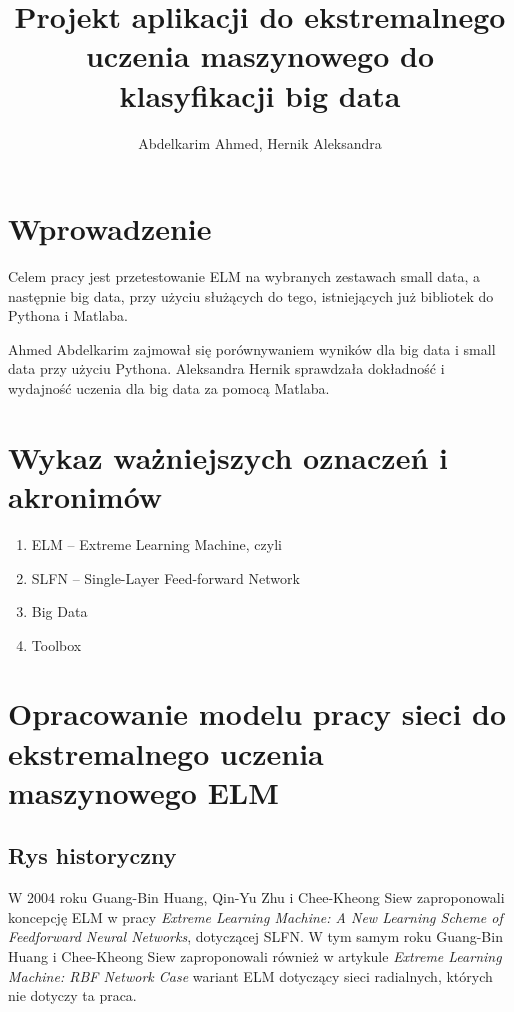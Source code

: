 \documentclass{article}
\title{Projekt aplikacji do ekstremalnego uczenia maszynowego do klasyfikacji big data}
\author{Abdelkarim Ahmed, Hernik Aleksandra}
\date{}
\begin{document}
\clearpage
\vspace*{\fill}
\begin{center}
\begin{minipage}{.9\textwidth}
\maketitle
\end{minipage}
\end{center}
\vfill %
\clearpage

\tableofcontents
\clearpage

\section*{Wprowadzenie}
Celem pracy jest przetestowanie ELM na wybranych zestawach small data, a następnie big data, przy użyciu służących do tego, istniejących już bibliotek do Pythona i Matlaba.

Ahmed Abdelkarim zajmował się porównywaniem wyników dla big data i small data przy użyciu Pythona.
Aleksandra Hernik sprawdzała dokładność i wydajność uczenia dla big data za pomocą Matlaba.

\section*{Wykaz ważniejszych oznaczeń i akronimów}
\begin{enumerate}
\item ELM -- Extreme Learning Machine, czyli 
\item SLFN -- Single-Layer Feed-forward Network 
\item Big Data
\item Toolbox
\end{enumerate}
\section{Opracowanie modelu pracy sieci do ekstremalnego uczenia maszynowego ELM}
\subsection{Rys historyczny}
W 2004 roku Guang-Bin Huang, Qin-Yu Zhu i Chee-Kheong Siew zaproponowali koncepcję ELM w pracy \textit{Extreme Learning Machine: A New Learning Scheme of Feedforward Neural Networks}, dotyczącej SLFN. W tym samym roku Guang-Bin Huang i Chee-Kheong Siew zaproponowali również w artykule \textit{Extreme Learning Machine: RBF Network Case} wariant ELM dotyczący sieci radialnych, których nie dotyczy ta praca. 
\end{document}
